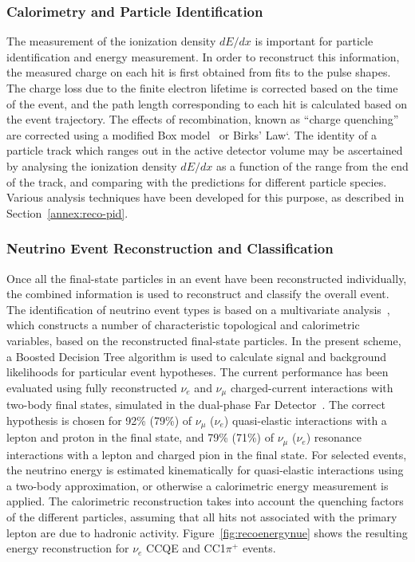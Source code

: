 \subsubsection{Calorimetry and Particle Identification}

The measurement of the ionization density $dE/dx$ is important
for particle identification and energy measurement.
In order to reconstruct this information, the measured charge on each hit 
is first obtained from fits to the pulse shapes.
The charge loss due to the finite electron lifetime is corrected
based on the time of the event, and the path length corresponding
to each hit is calculated based on the event trajectory.
The effects of recombination, known as ``charge quenching''
are corrected using a modified Box model~\cite{Thomas:1987zz} 
or Birks' Law`\cite{Birks:1964zz}.
The identity of a particle track which ranges out in the active detector volume
may be ascertained by analysing the ionization density $dE/dx$ as a function of 
the range from the end of the track, and comparing with the predictions
for different particle species. Various analysis techniques have been developed
for this purpose, as described in Section~\ref{annex:reco-pid}.
 

\subsubsection{Neutrino Event Reconstruction and Classification}

Once all the final-state particles in an event have been reconstructed individually, 
the combined information is used to reconstruct and classify the overall event.
The identification of neutrino event types is based on a 
multivariate analysis~\cite{Back:2013cva,WA105_TDR,LAGUNA-LBNO-deliv,LAGUNA-LBNO-EOI},
which constructs a number of characteristic topological and calorimetric variables,
based on the reconstructed final-state particles. In the present scheme,
a Boosted Decision Tree algorithm is used to calculate signal and background likelihoods 
for particular event hypotheses. The current performance has been evaluated using fully reconstructed
$\nu_{e}$ and $\nu_{\mu}$ charged-current interactions with two-body final states,
simulated in the dual-phase Far Detector~\cite{LAGUNA-LBNO-deliv}. 
The correct hypothesis is chosen for 92\% (79\%) of $\nu_{\mu}$ ($\nu_{e}$) quasi-elastic interactions 
with a lepton and proton in the final state, and 79\% (71\%) of $\nu_{\mu}$ ($\nu_{e}$) 
resonance interactions with a lepton and charged pion in the final state.
For selected events, the neutrino energy is estimated kinematically for quasi-elastic interactions
using a two-body approximation, or otherwise a calorimetric energy measurement is applied.
The calorimetric reconstruction takes into account the quenching factors of the different particles, 
assuming that all hits not associated with the primary lepton are due to hadronic activity.
Figure~\ref{fig:recoenergynue} shows the resulting energy reconstruction for $\nu_e$ CCQE and CC1$\pi^{+}$ events.

